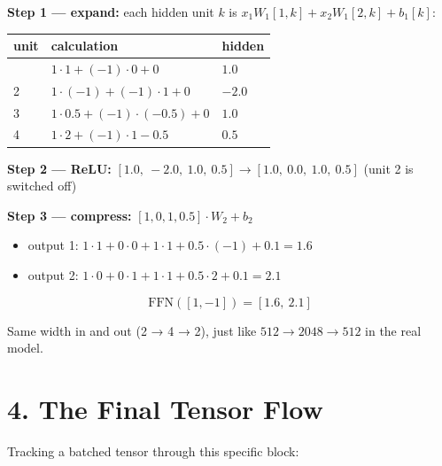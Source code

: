 \documentclass[11pt,a4paper,oneside]{report}
\providecommand{\tightlist}{\setlength{\itemsep}{0pt}\setlength{\parskip}{0pt}}
\begin{document}
\begin{center}\end{center}

\textbf{Step 1 --- expand:} each hidden unit \(k\) is \(x_1 W_1[1,k] + x_2 W_1[2,k] + b_1[k]\):

{\def\LTcaptype{none} %
\begin{longtable}[]{@{}lll@{}}
\toprule\noalign{}
unit & calculation & hidden \\
\midrule\noalign{}
\endhead
\bottomrule\noalign{}
\endlastfoot
1 & \(1 \cdot 1 + (-1) \cdot 0 + 0\) & \(1.0\) \\
2 & \(1 \cdot (-1) + (-1) \cdot 1 + 0\) & \(-2.0\) \\
3 & \(1 \cdot 0.5 + (-1) \cdot (-0.5) + 0\) & \(1.0\) \\
4 & \(1 \cdot 2 + (-1) \cdot 1 - 0.5\) & \(0.5\) \\
\end{longtable}
}

\textbf{Step 2 --- ReLU:} \([1.0,\ -2.0,\ 1.0,\ 0.5] \rightarrow [1.0,\ \mathbf{0.0},\ 1.0,\ 0.5]\) (unit 2 is switched off)

\textbf{Step 3 --- compress:} \([1, 0, 1, 0.5] \cdot W_2 + b_2\)

\begin{itemize}
\tightlist
\item
  output 1: \(1 \cdot 1 + 0 \cdot 0 + 1 \cdot 1 + 0.5 \cdot (-1) + 0.1 = 1.6\)
\item
  output 2: \(1 \cdot 0 + 0 \cdot 1 + 1 \cdot 1 + 0.5 \cdot 2 + 0.1 = 2.1\)
\end{itemize}

\[\text{FFN}([1, -1]) = [1.6,\ 2.1]\]

Same width in and out (2 → 4 → 2), just like \(512 \rightarrow 2048 \rightarrow 512\) in the real model.

\section{4. The Final Tensor Flow}\label{4-the-final-tensor-flow}

Tracking a batched tensor through this specific block:
\end{document}
